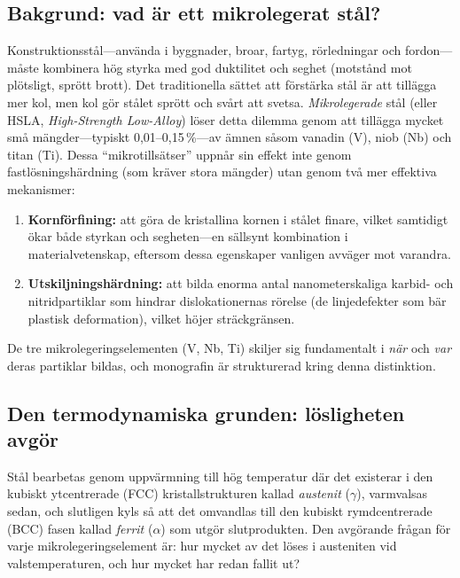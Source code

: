 \documentclass[11pt,a4paper]{article}
\begin{document}
\subsection{Bakgrund: vad \"ar ett mikrolegerat st\aa{}l?}

Konstruktionsst\aa{}l---anv\"anda i byggnader, broar, fartyg,
r\"orledningar och fordon---m\aa{}ste kombinera h\"og styrka med god
duktilitet och seghet (motst\aa{}nd mot pl\"otsligt, spr\"ott brott).
Det traditionella s\"attet att f\"orst\"arka st\aa{}l \"ar att
till\"agga mer kol, men kol g\"or st\aa{}let spr\"ott och sv\aa{}rt att
svetsa.  \emph{Mikrolegerade} st\aa{}l (eller HSLA,
\emph{High-Strength Low-Alloy}) l\"oser detta dilemma genom att
till\"agga mycket sm\aa{} m\"angder---typiskt 0,01--0,15\,\%---av
\"amnen s\aa{}som vanadin (V), niob (Nb) och titan (Ti).  Dessa
``mikrotills\"atser'' uppn\aa{}r sin effekt inte genom
fastl\"osningsh\"ardning (som kr\"aver stora m\"angder) utan genom tv\aa{}
mer effektiva mekanismer:
\begin{enumerate}
  \item \textbf{Kornf\"orfining:} att g\"ora de kristallina kornen i
    st\aa{}let finare, vilket samtidigt \"okar b\aa{}de styrkan och
    segheten---en s\"allsynt kombination i materialvetenskap, eftersom
    dessa egenskaper vanligen avv\"ager mot varandra.
  \item \textbf{Utskiljningsh\"ardning:} att bilda enorma antal
    nanometerskaliga karbid- och nitridpartiklar som hindrar
    dislokationernas r\"orelse (de linjedefekter som b\"ar plastisk
    deformation), vilket h\"ojer str\"ackgr\"ansen.
\end{enumerate}

De tre mikrolegeringselementen (V, Nb, Ti) skiljer sig fundamentalt i
\emph{n\"ar} och \emph{var} deras partiklar bildas, och monografin \"ar
strukturerad kring denna distinktion.

\subsection{Den termodynamiska grunden: l\"osligheten avg\"or}

St\aa{}l bearbetas genom uppv\"armning till h\"og temperatur d\"ar det
existerar i den kubiskt ytcentrerade (FCC) kristallstrukturen kallad
\emph{austenit} ($\gamma$), varmvalsas sedan, och slutligen kyls s\aa{}
att det omvandlas till den kubiskt rymdcentrerade (BCC) fasen kallad
\emph{ferrit} ($\alpha$) som utg\"or slutprodukten.  Den avg\"orande
fr\aa{}gan f\"or varje mikrolegeringselement \"ar: hur mycket av det
l\"oses i austeniten vid valstemperaturen, och hur mycket har redan
fallit ut?
\end{document}
